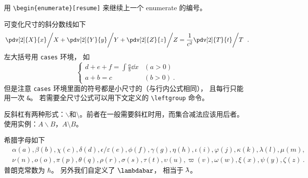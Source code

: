 用 \verb|\begin{enumerate}[resume]|  来继续上一个 enumerate 的编号。

可变化尺寸的斜分数线如下
\begin{equation}
\left. \pdv[2]{X}{x} \middle/ X + \pdv[2]{Y}{y} \middle/ Y + \pdv[2]{Z}{z} \middle/ Z  = \frac{1}{c^2}  \pdv[2]{T}{t} \middle/ T\right.~.
\end{equation}
左大括号用 \verb|cases| 环境， 如
\begin{equation}
\begin{cases}
d+e+f = \int \frac{a}{b} \dd{x} &(a > 0)\\
a+b = c &(b > 0)~.
\end{cases}
\end{equation}
但是注意 \verb|cases| 环境里面的符号都是小尺寸的（与行内公式相同）， 且每行只能用一次 \verb|&|。 若需要全尺寸公式可以用下文定义的 \verb|\leftgroup| 命令。

反斜杠有两种形式：$\backslash$和$\setminus$。前者在一般需要斜杠时用，而集合减法应该用后者。使用实例：$A\backslash B$，$A\setminus B$。

希腊字母如下
\begin{equation}
\begin{aligned}
&\alpha (a), \beta (b), \chi (c), \delta (d), \epsilon/\varepsilon (e), \phi (f), \gamma (g),
\eta (h), \iota (i), \varphi (j), \kappa (k), \lambda (l), \mu (m),\\
& \nu (n), o (o), \pi (p), \theta (q), \rho (r), \sigma (s), \tau (t), \upsilon (u), \varpi (v), \omega (w), \xi (x), \psi (y), \zeta (z)~.
\end{aligned}
\end{equation}
普朗克常数为 $\hbar$。 另外我们自定义了 $\lambdabar$， 相当于 $\mkern-0.25mu {\bar{\phantom{a}}} \mkern -10.2mu\lambda$。

